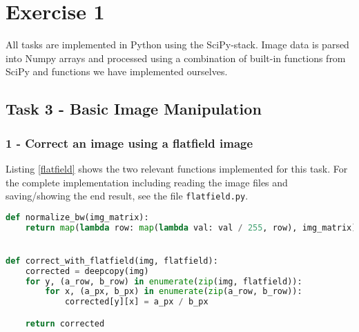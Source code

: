 \chapter{Exercise 1}

All tasks are implemented in Python using the SciPy-stack.
Image data is parsed into Numpy arrays and processed using a combination of built-in functions from SciPy and functions we have implemented ourselves.

\section*{Task 3 - Basic Image Manipulation}

\subsection*{1 - Correct an image using a flatfield image}

Listing \ref{flatfield} shows the two relevant functions implemented for this task.
For the complete implementation including reading the image files and saving/showing the end result, see the file \texttt{flatfield.py}.

\begin{lstlisting}[language=Python, label=flatfield, caption=Flatfield image correction]
def normalize_bw(img_matrix):
    return map(lambda row: map(lambda val: val / 255, row), img_matrix)


def correct_with_flatfield(img, flatfield):
    corrected = deepcopy(img)
    for y, (a_row, b_row) in enumerate(zip(img, flatfield)):
        for x, (a_px, b_px) in enumerate(zip(a_row, b_row)):
            corrected[y][x] = a_px / b_px

    return corrected
\end{lstlisting}

